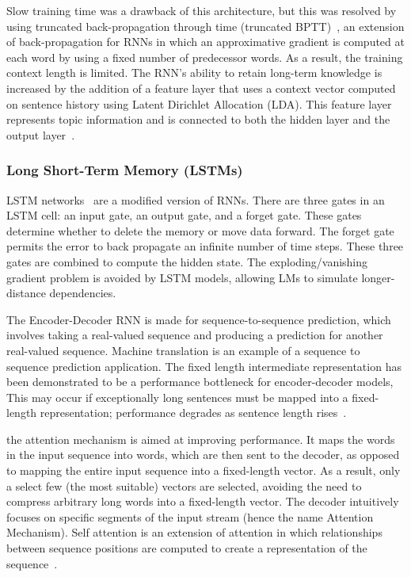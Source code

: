 Slow training time was a drawback of this architecture, but this was resolved by using truncated back-propagation through time (truncated BPTT)~\cite{rnn}, an extension of back-propagation for RNNs in which an approximative gradient is computed at each word by using a fixed number of predecessor words.  As a result, the training context length is limited. The RNN's ability to retain long-term knowledge is increased by the addition of a feature layer that uses a context vector computed on sentence history using Latent Dirichlet Allocation (LDA). This feature layer represents topic information and is connected to both the hidden layer and the output layer~\cite{mikolov-rnn}.

\subsubsection{Long Short-Term Memory (LSTMs)}
LSTM networks~\cite{lstm} are a modified version of RNNs. There are three gates in an LSTM cell: an input gate, an output gate, and a forget gate. These gates determine whether to delete the memory or move data forward. The forget gate permits the error to back propagate an infinite number of time steps. These three gates are combined to compute the hidden state. The exploding/vanishing gradient problem is avoided by LSTM models, allowing LMs to simulate longer-distance dependencies.

The Encoder-Decoder RNN is made for sequence-to-sequence prediction, which involves taking a real-valued sequence and producing a prediction for another real-valued sequence. Machine translation is an example of a sequence to sequence prediction application. The fixed length intermediate representation has been demonstrated to be a performance bottleneck for encoder-decoder models, This may occur if exceptionally long sentences must be mapped into a fixed-length representation; performance degrades as sentence length rises~\cite{encoder}.

the attention mechanism is aimed at improving performance. It maps the words in the input sequence into words, which are then sent to the decoder, as opposed to mapping the entire input sequence into a fixed-length vector. As a result, only a select few (the most suitable) vectors are selected, avoiding the need to compress arbitrary long words into a fixed-length vector. The decoder intuitively focuses on specific segments of the input stream (hence the name Attention Mechanism). Self attention is an extension of attention in which relationships between sequence positions are computed to create a representation of the sequence~\cite{attention}.

